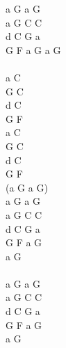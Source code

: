 \documentclass[a5paper, 10pt]{book}
\begin{document}
\begin{minipage}[t]{0.2\textwidth}
  a G a G\\
  a G C C\\
  d C G a\\
  G F a G a G\\
  \\
  a C\\
  G C\\
  d C\\
  G F\\
  a C\\
  G C\\
  d C\\
  G F\\
  (a G a G)\\

  a G a G\\
  a G C C\\
  d C G a\\
  G F a G\\
  a G\\
  ~\\
  a G a G\\
  a G C C\\
  d C G a\\
  G F a G\\
  a G\\
\end{minipage}

\newpage
\end{document}

